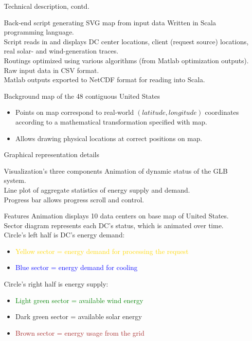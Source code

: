 \documentclass[xcolor=dvipsnames]{beamer}
\begin{document}
\begin{frame}{Technical description, contd.}
	\begin{block}{Back-end script generating SVG map from input data}
	Written in Scala programming language. \\
	Script reads in and displays DC center locations, client (request source) locations, real solar- and wind-generation traces. \\
	Routings optimized using various algorithms (from Matlab optimization outputs). \\
	Raw input data in CSV format.\\
	Matlab outputs exported to NetCDF format for reading into Scala.
	\end{block}
	\begin{block}{Background map of the 48 contiguous United States}
		\begin{itemize} 
	\item 	Points on map correspond to real-world $(latitude, longitude)$ coordinates according to a mathematical transformation specified with map. 
	\item 	Allows drawing physical locations at correct positions on map.
		\end{itemize}
	\end{block}
\end{frame}

\begin{frame}{Graphical representation details}

	\begin{block}{Visualization's three components}
	Animation of dynamic status of the GLB system. \\
	Line plot of aggregate statistics of energy supply and demand. \\  
	Progress bar allows progress scroll and control.
	\end{block}

	\begin{block}{Features}
	Animation displays 10 data centers on base map of United States. \\
	Sector diagram represents each DC's status, which is animated over time. \\
	Circle's left half is DC's energy demand: 
		\begin{itemize}
		\item{\textcolor{gold}{Yellow sector = energy demand for processing the request}}
		\item{\textcolor{blue}{Blue sector = energy demand for cooling} }
		\end{itemize}
	Circle's right half is energy supply: 
		\begin{itemize}
		\item{\textcolor{green}{Light green sector = available wind energy}}
		\item{\textcolor{dgreen}{Dark green sector = available solar energy}}
		\item{\textcolor{brown}{Brown sector = energy usage from the grid}}
		\end{itemize} 
           \end{block} 
\end{frame}
\end{document}
